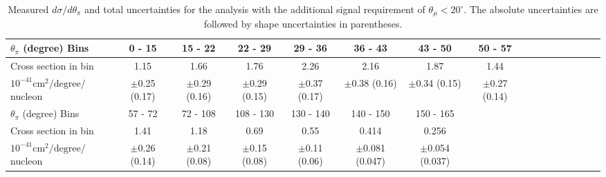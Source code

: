 \clearpage
\begingroup
\squeezetable
\begin{table}[h]
\begin{tabular}{l|ccccccccccccccc}
\hline\hline
$\theta_{\pi}$ (degree) Bins & 0 - 15 & 15 - 22 & 22 - 29 & 29 - 36 & 36 - 43 & 43 - 50 & 50 - 57 \\ 
\hline
Cross section in bin & 1.15 & 1.66 & 1.76 & 2.26 & 2.16 & 1.87 & 1.44  \\ 
$10^{-41}\mathrm{cm}^2/\mathrm{degree}/$nucleon &  $\pm$0.25 (0.17) &  $\pm$0.29 (0.16) &  $\pm$0.29 (0.15) &  $\pm$0.37 (0.17) &  $\pm$0.38 (0.16) &  $\pm$0.34 (0.15) &  $\pm$0.27 (0.14) \\ 
\hline
$\theta_{\pi}$ (degree) Bins & 57 - 72 & 72 - 108 & 108 - 130 & 130 - 140 & 140 - 150 & 150 - 165 \\ 
\hline
Cross section in bin & 1.41 & 1.18 & 0.69 & 0.55 & 0.414 & 0.256 \\ 
$10^{-41}\mathrm{cm}^2/\mathrm{degree}/$nucleon &  $\pm$0.26 (0.14) &  $\pm$0.21 (0.08) &  $\pm$0.15 (0.08) &  $\pm$0.11 (0.06) &  $\pm$0.081 (0.047) &  $\pm$0.054 (0.037) \\ 
\hline\hline
\end{tabular}
\caption{Measured $d\sigma / d\theta_\pi$ and total uncertainties for the \cconepi analysis with the additional signal requirement of $\theta_\mu < 20^\circ$.  The absolute uncertainties 
are followed by shape uncertainties in parentheses.}
\end{table}
\endgroup

